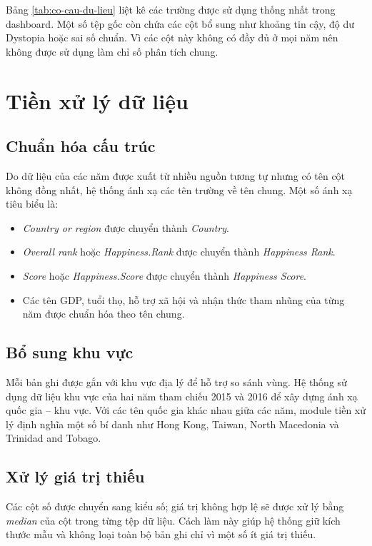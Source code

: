 Bảng \ref{tab:co-cau-du-lieu} liệt kê các trường được sử dụng thống nhất trong dashboard. Một số tệp gốc còn chứa các cột bổ sung như khoảng tin cậy, độ dư Dystopia hoặc sai số chuẩn. Vì các cột này không có đầy đủ ở mọi năm nên không được sử dụng làm chỉ số phân tích chung.

\section{Tiền xử lý dữ liệu}

\subsection{Chuẩn hóa cấu trúc}

Do dữ liệu của các năm được xuất từ nhiều nguồn tương tự nhưng có tên cột không đồng nhất, hệ thống ánh xạ các tên trường về tên chung. Một số ánh xạ tiêu biểu là:

\begin{itemize}
    \item \textit{Country or region} được chuyển thành \textit{Country}.
    \item \textit{Overall rank} hoặc \textit{Happiness.Rank} được chuyển thành \textit{Happiness Rank}.
    \item \textit{Score} hoặc \textit{Happiness.Score} được chuyển thành \textit{Happiness Score}.
    \item Các tên GDP, tuổi thọ, hỗ trợ xã hội và nhận thức tham nhũng của từng năm được chuẩn hóa theo tên chung.
\end{itemize}

\subsection{Bổ sung khu vực}

Mỗi bản ghi được gắn với khu vực địa lý để hỗ trợ so sánh vùng. Hệ thống sử dụng dữ liệu khu vực của hai năm tham chiếu 2015 và 2016 để xây dựng ánh xạ quốc gia -- khu vực. Với các tên quốc gia khác nhau giữa các năm, module tiền xử lý định nghĩa một số bí danh như Hong Kong, Taiwan, North Macedonia và Trinidad and Tobago.

\subsection{Xử lý giá trị thiếu}

Các cột số được chuyển sang kiểu số; giá trị không hợp lệ sẽ được xử lý bằng \textit{median} của cột trong từng tệp dữ liệu. Cách làm này giúp hệ thống giữ kích thước mẫu và không loại toàn bộ bản ghi chỉ vì một số ít giá trị thiếu.

